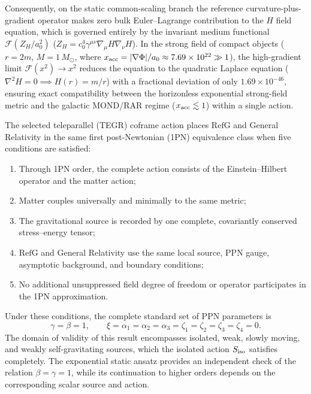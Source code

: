 \documentclass[11pt,a4paper]{article}
\newcommand{\RefG}{\mathrm{RefG}}
\begin{document}
\begin{enumerate}[label=\arabic*.]
\begin{equation}
\end{equation}
Consequently, on the static common-scaling branch the reference curvature-plus-gradient operator makes zero bulk Euler--Lagrange contribution to the $H$ field equation, which is governed entirely by the invariant medium functional $\mathcal{F}(Z_H/a_0^2)$ ($Z_H = c_0^4\gamma^{\mu\nu}\nabla_\mu H\nabla_\nu H$). In the strong field of compact objects ($r=2m$, $M=1\,M_\odot$, where $x_{\rm acc} = |\nabla\Phi|/a_0 \approx 7.69\times 10^{22} \gg 1$), the high-gradient limit $\mathcal{F}(x^2) \to x^2$ reduces the equation to the quadratic Laplace equation ($\nabla^2 H = 0 \implies H(r) = m/r$) with a fractional deviation of only $1.69\times 10^{-46}$, ensuring exact compatibility between the horizonless exponential strong-field metric and the galactic MOND/RAR regime ($x_{\rm acc} \lesssim 1$) within a single action.
\end{enumerate}

The selected teleparallel (TEGR) coframe action places $\RefG$ and General Relativity in the same first post-Newtonian (1PN) equivalence class when five conditions are satisfied:
\begin{enumerate}[label=\arabic*.]
\item Through 1PN order, the complete action consists of the Einstein--Hilbert operator and the matter action;
\item Matter couples universally and minimally to the same metric;
\item The gravitational source is recorded by one complete, covariantly conserved stress--energy tensor;
\item $\RefG$ and General Relativity use the same local source, PPN gauge, asymptotic background, and boundary conditions;
\item No additional unsuppressed field degree of freedom or operator participates in the 1PN approximation.
\end{enumerate}
Under these conditions, the complete standard set of PPN parameters is
\begin{equation}
\gamma=\beta=1,\qquad
\xi=\alpha_1=\alpha_2=\alpha_3=
\zeta_1=\zeta_2=\zeta_3=\zeta_4=0.
\end{equation}
The domain of validity of this result encompasses isolated, weak, slowly moving, and weakly self-gravitating sources, which the isolated action $S_{\rm iso}$ satisfies completely. The exponential static ansatz provides an independent check of the relation $\beta=\gamma=1$, while its continuation to higher orders depends on the corresponding scalar source and action.
\end{document}
